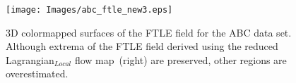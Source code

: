 \begin{figure}[!t]
\centering
\texttt{[image: Images/abc\_ftle\_new3.eps]}
\caption{{3D colormapped surfaces of the FTLE field for the ABC data set. Although extrema of the FTLE field derived using the reduced Lagrangian$_{Local}$ flow map~(right) are preserved, other regions are overestimated.}} %
\label{abc_ftle}
\vspace{-6mm}
\end{figure}
